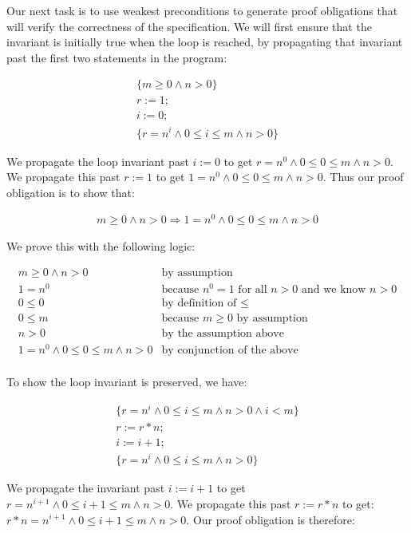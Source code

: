\documentclass[11pt]{article}
\begin{document}
Our next task is to use weakest preconditions to generate proof
obligations that will verify the correctness of the specification.
We will first ensure that the invariant is initially true when
the loop is reached, by propagating that invariant past the first
two statements in the program:

\[
\begin{array}{l}
\{m \ge 0 \land n > 0\}\\
r := 1;\\
i := 0;\\
\{ r=n^i \land 0 \le i \le m \land n > 0 \}
\end{array}
\]

We propagate the loop invariant past $i :=0$ to get
$r=n^0 \land 0 \le 0 \le m \land n > 0$.  We propagate this
past $r :=1$ to get $1=n^0 \land 0 \le 0 \le m \land n > 0$.
Thus our proof obligation is to show that:

\[
\begin{array}{l}
m \ge 0 \land n > 0
\Rightarrow 1=n^0 \land 0 \le 0 \le m \land n > 0
\end{array}
\]

We prove this with the following logic:

\[
\begin{array}{ll}
m \ge 0 \land n > 0 & \mbox{by assumption}\\
1=n^0 & \mbox{because $n^0=1$ for all $n>0$ and we know $n>0$}\\
0 \le 0 & \mbox{by definition of $\le$}\\
0 \le m & \mbox{because $m \ge 0$ by assumption}\\
n > 0 & \mbox{by the assumption above}\\
1=n^0 \land 0 \le 0 \le m \land n > 0 & \mbox{by conjunction of the above}\\
\end{array}
\]

To show the loop invariant is preserved, we have:

\[
\begin{array}{l}
\{ r=n^i \land 0 \le i \le m \land n > 0  \land i < m\}\\
r := r*n;\\
i := i+1;\\
\{ r=n^i \land 0 \le i \le m \land n > 0 \}
\end{array}
\]

We propagate the invariant past $i:=i+1$ to get $r=n^{i+1} \land 0 \le i+1 \le m
\land n > 0$.  We propagate this past $r:=r*n$ to get: $r*n=n^{i+1} \land 0 \le
i+1 \le m \land n > 0$.  Our proof obligation is therefore:
\end{document}
